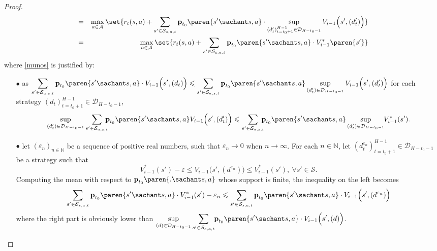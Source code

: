 \begin{proof}
\begin{eqnarray}
\label{munos} & = & \max_{a \in \mathcal{A} } \set{ r_t(s,a) 
+ \sum_{s' \in \mathcal{S}_{s,a,t}} \textbf{p}_{t_0} \paren{s' \sachant s , a } \cdot \sup_{(d_{t}')_{t=t_0+1}^{H-1} \in \mathcal{D}_{H-t_0-1}}  V_{i-1} \Big( s',(d_t') \Big) } \\
\nonumber & = & \max_{ a \in \mathcal{A} } \set{ r_t(s,a) 
+ \sum_{s' \in \mathcal{S}_{s,a,t}} \textbf{p}_{t_0} \paren{s' \sachant s , a } \cdot V_{i-1}^* \paren{ s' } }
\end{eqnarray}
where \ref{munos} is justified by:
\begin{itemize}
\item[$\bullet$] as $ \displaystyle \sum_{s' \in \mathcal{S}_{a,s,t}} \textbf{p}_{t_0} \paren{s' \sachant s , a } \cdot V_{i-1} \Big( s',(d_t) \Big) \leqslant  \sum_{s' \in \mathcal{S}_{a,s,t}} \textbf{p}_{t_0} \paren{s' \sachant s , a } \sup_{(d_{t}') \in \mathcal{D}_{H-t_0-1} } V_{i-1} \Big( s',(d_t') \Big)$
for each strategy $(d_t)_{t=t_0 +1}^{H-1} \in \mathcal{D}_{H-t_0-1}$,
\[ \sup_{(d_{t}') \in \mathcal{D}_{H-t_0-1} } \sum_{s' \in \mathcal{S}_{a,s,t}} \hspace{-0.2cm} \textbf{p}_{t_0} \paren{s' \sachant s , a } V_{i-1} \Big( s',(d_t') \Big) \leqslant 
 \sum_{s' \in \mathcal{S}_{a,s,t}} \hspace{-0.2cm}
\textbf{p}_{t_0} \paren{s' \sachant s , a } \sup_{(d_{t}') \in \mathcal{D}_{H-t_0-1} } \hspace{-0.1cm} V_{i-1}^* (s'). \]
\item[$\bullet$] let $(\varepsilon_n)_{n \in \mathbb{N}}$ be a sequence of positive real numbers, 
such that $\varepsilon_n \rightarrow 0$ when $n \rightarrow \infty$. 
For each $n \in \mathbb{N}$, let $(d^{\varepsilon_n}_t)_{t=t_0+1}^{H-1} \in \mathcal{D}_{H-t_0-1}$ 
be a strategy such that \[ V^*_{i-1}(s') - \varepsilon \leqslant V_{i-1}\Big(s', (d^{\varepsilon_n})\Big) \leqslant V_{i-1}^*(s'), \ \forall s' \in \mathcal{S}. \]
Computing the mean with respect to $\textbf{p}_{t_0} \paren{ . \sachant s,a}$ whose support is finite,
the inequality on the left becomes
\[ \sum_{s' \in \mathcal{S}_{s,a,t}} \textbf{p}_{t_0} \paren{ s' \sachant s,a} \cdot V^*_{i-1}(s') -\varepsilon_n \leqslant \sum_{s' \in \mathcal{S}_{s,a,t}} \textbf{p}_{t_0} \paren{ s' \sachant s,a} \cdot V_{i-1}\Big(s', (d^{\varepsilon_n})\Big) \] 
where the right part is obviously lower than $ \displaystyle \sup_{(d) \in \mathcal{D}_{H-t_0-1}} \sum_{s' \in \mathcal{S}_{s,a,t}} \hspace{-0.1cm} \textbf{p}_{t_0} \paren{ s' \sachant s,a} \cdot V_{i-1}\Big(s', (d)\Big) $.

\end{itemize}
\end{proof}
